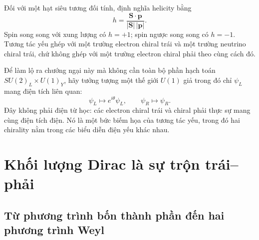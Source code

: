 Đối với một hạt siêu tương đối tính, định nghĩa helicity bằng
\begin{equation}
  h=\frac{\bm S\cdot\bm p}{|\bm S|\,|\bm p|}.
\end{equation}
Spin song song với xung lượng có \(h=+1\); spin ngược song song có \(h=-1\). Tương tác yếu ghép với một trường electron chiral trái và một trường neutrino chiral trái, chứ không ghép với một trường electron chiral phải theo cùng cách đó.

Để làm lộ ra chướng ngại này mà không cần toàn bộ phần hạch toán \(SU(2)_L\times U(1)_Y\), hãy tưởng tượng một thế giới \(U(1)\) giả trong đó chỉ \(\psi_L\) mang điện tích liên quan:
\begin{equation}
  \psi_L\longmapsto e^{i\theta}\psi_L,
  \qquad
  \psi_R\longmapsto\psi_R .
  \label{eq:l09-chiral-toy-charge}
\end{equation}
Đây không phải điện từ học: các electron chiral trái và chiral phải thực sự mang cùng điện tích điện. Nó là một bức biếm họa của tương tác yếu, trong đó hai chirality nằm trong các biểu diễn điện yếu khác nhau.

\begin{classroomqa}
\end{classroomqa}

\section{Khối lượng Dirac là sự trộn trái--phải}

\subsection{Từ phương trình bốn thành phần đến hai phương trình Weyl}

